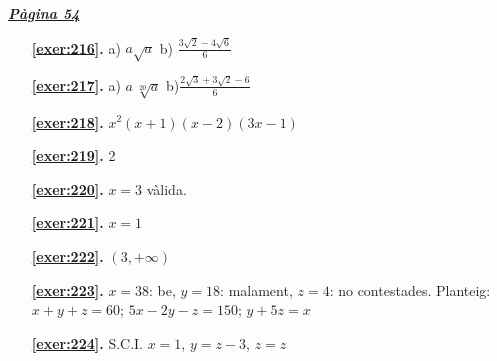  \vspace{1cm} 


\vspace{0.3cm}


\hyperlink{page.54}{\textbf{\em Pàgina 54}}
\begin{enumerate}
\item[\fontfamily{phv}\selectfont\color{blue}\textbf{\ref{exer:216}. }] \label{ans:216} 
a) $a\sqrt {a}$ \quad \quad b) $\frac {3\sqrt {2}-4\sqrt {6}}{6}$
 \end{enumerate}
\begin{enumerate}
\item[\fontfamily{phv}\selectfont\color{blue}\textbf{\ref{exer:217}. }] \label{ans:217} 
a) $a\,\sqrt [20]{a}$ \quad \quad b)$\frac {2\sqrt {3}+3\sqrt {2}-6}{6}$
\item[\fontfamily{phv}\selectfont\color{blue}\textbf{\ref{exer:218}. }] \label{ans:218} 
$x^2 (x+1) (x-2) (3x-1)$
\item[\fontfamily{phv}\selectfont\color{blue}\textbf{\ref{exer:219}. }] \label{ans:219} 
2
\item[\fontfamily{phv}\selectfont\color{blue}\textbf{\ref{exer:220}. }] \label{ans:220} 
$x=3$ vàlida.
\item[\fontfamily{phv}\selectfont\color{blue}\textbf{\ref{exer:221}. }] \label{ans:221} 
$x=1$
\item[\fontfamily{phv}\selectfont\color{blue}\textbf{\ref{exer:222}. }] \label{ans:222} 
$(3, +\infty )$
\item[\fontfamily{phv}\selectfont\color{blue}\textbf{\ref{exer:223}. }] \label{ans:223} 
$x=38$: be, $y=18$: malament, $z=4$: no contestades. Planteig: $x+y+z=60$; $5x-2y-z=150$; $y+5z=x$
\item[\fontfamily{phv}\selectfont\color{blue}\textbf{\ref{exer:224}. }] \label{ans:224} 
S.C.I. $x=1$, $y=z-3$, $z=z$
 \end{enumerate}
\vspace{0.3cm}


